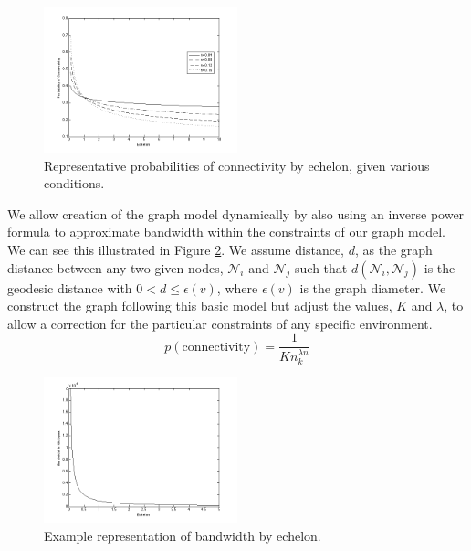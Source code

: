 \documentclass[10pt]{./IEEEtran}
\begin{document}
\begin{figure}[h!]
  \centering
    \includegraphics[width=0.5\textwidth]{images/probcon}
  \caption{Representative probabilities of connectivity by echelon, given various conditions.}
  \label{fig:probcon}
\end{figure}

We allow creation of the graph model dynamically by also using an inverse power formula to approximate bandwidth  within the constraints of our graph model.  We can see this illustrated in Figure \ref{fig:bandwidth}.  We assume distance, $d$, as the graph distance between any two given nodes, $\mathscr{N}_i$ and $\mathscr{N}_j$ such that $d(\mathscr{N}_{i}, \mathscr{N}_{j})$ is the geodesic distance with $0<d\leq \epsilon(v)$, where $\epsilon(v)$ is the graph diameter.  We construct the graph following this basic model but adjust the values, $K$ and $\lambda$, to allow a correction for the particular constraints of any specific environment.
\[
	p(\mbox{connectivity}) = \dfrac{1}{Kn_{k}^{\lambda n}}
\]

\begin{figure}[h!]
  \centering
    \includegraphics[width=0.5\textwidth]{images/bandwidth}
  \caption{Example representation of bandwidth by echelon.}
  \label{fig:bandwidth}
\end{figure}
\end{document}
